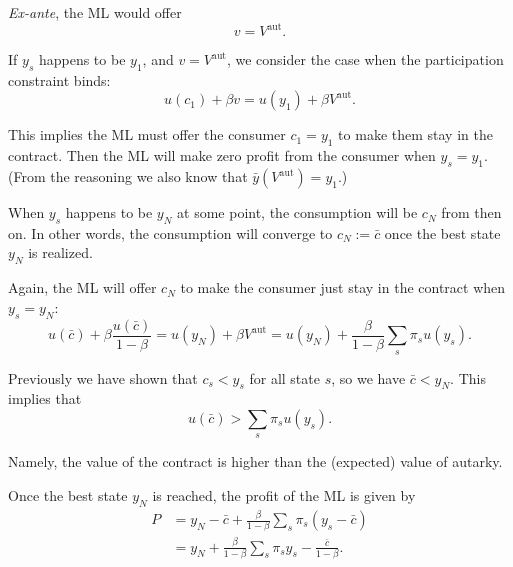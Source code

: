 \textit{Ex-ante}, the ML would offer
\[
v = V^\text{aut}.
\]

If $y_s$ happens to be $y_1$, and $v = V^\text{aut}$, we consider the case when the participation constraint binds:
\[
u(c_1)+\beta v = u(y_1)+\beta V^{\text{aut}}.
\]

This implies the ML must offer the consumer $c_1 = y_1$ to make them stay in the contract. Then the ML will make zero profit from the consumer when $y_s = y_1$. (From the reasoning we also know that $\bar y (V^{\text{aut}}) = y_1$.)

When $y_s$ happens to be $y_N$ at some point, the consumption will be $c_N$ from then on. In other words, the consumption will converge to $c_N:=\bar c$ once the best state $y_N$ is realized.

Again, the ML will offer $c_N$ to make the consumer just stay in the contract when $y_s = y_N$:
\[
u(\bar c)+ \beta \frac{u(\bar c)}{1-\beta} = u(y_N) + \beta V^{\text{aut}} = u(y_N) + \frac{\beta}{1-\beta}\sum_s\pi_s u(y_s).
\]

Previously we have shown that $c_s<y_s$ for all state $s$, so we have $\bar c < y_N$. This implies that
\[
u(\bar c)>\sum_s\pi_s u(y_s).
\]

Namely, the value of the contract is higher than the (expected) value of autarky.

Once the best state $y_N$ is reached, the profit of the ML is given by
\[
\begin{aligned}
    P & = y_N-\bar c+\frac{\beta}{1-\beta}\sum_s\pi_s(y_s-\bar c)\\
    & = y_N+\frac{\beta}{1-\beta}\sum_s\pi_sy_s-\frac{\bar c}{1-\beta}.
\end{aligned}
\]


